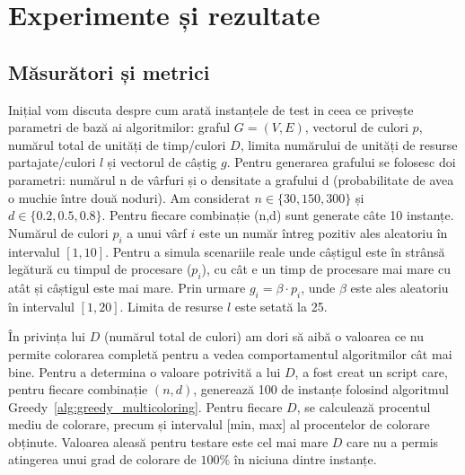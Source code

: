 \chapter{Experimente și rezultate}

\section{Măsurători și metrici}
Inițial vom discuta despre cum arată instanțele de test in ceea ce privește parametri de bază ai algoritmilor: graful $G=(V,E)$, vectorul de culori $p$, numărul total de unități de timp/culori $D$, limita numărului de unități de resurse partajate/culori $l$ și vectorul de câștig $g$. Pentru generarea grafului se folosesc doi parametri: numărul n de vârfuri și o densitate a grafului d (probabilitate de avea o muchie între două noduri). Am considerat $n \in \{30,150,300\}$ și $d \in \{0.2, 0.5, 0.8\}$. Pentru fiecare combinație (n,d) sunt generate câte 10 instanțe. Numărul de culori $p_i$ a unui vârf $i$ este un număr întreg pozitiv ales aleatoriu în intervalul $[1,10]$. Pentru a simula scenariile reale unde câștigul este în strânsă legătură cu timpul de procesare ($p_i$), cu cât e un timp de procesare mai mare cu atât și câștigul este mai mare. Prin urmare $g_i = \beta \cdot p_i$, unde $\beta$ este ales aleatoriu în intervalul $[1,20]$. Limita de resurse $l$ este setată la 25.

În privința lui $D$ (numărul total de culori) am dori să aibă o valoarea ce nu permite colorarea completă pentru a vedea comportamentul algoritmilor cât mai bine.
Pentru a determina o valoare potrivită a lui $D$, a fost creat un script care, pentru fiecare combinație $(n, d)$, generează 100 de instanțe folosind algoritmul Greedy~\ref{alg:greedy_multicoloring}. Pentru fiecare $D$, se calculează procentul mediu de colorare, precum și intervalul [min, max] al procentelor de colorare obținute. Valoarea aleasă pentru testare este cel mai mare $D$ care nu a permis atingerea unui grad de colorare de $100\%$ în niciuna dintre instanțe. 

